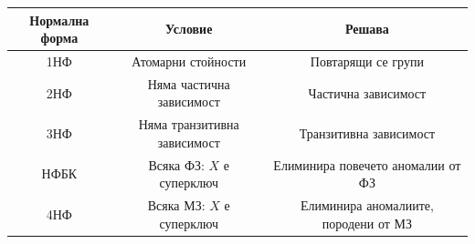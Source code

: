 \documentclass{scrartcl}
\begin{document}
\begin{FlushLeft}
\begin{center}
\begin{tabular}{|c|c|c|}
\hline
\textbf{Нормална форма} & \textbf{Условие} & \textbf{Решава} \\
\hline
1НФ & Атомарни стойности & Повтарящи се групи \\
\hline
2НФ & Няма частична зависимост & Частична зависимост \\
\hline
3НФ & Няма транзитивна зависимост & Транзитивна зависимост \\
\hline
НФБК & Всяка ФЗ: $X$ е суперключ & Елиминира повечето аномалии от ФЗ \\
\hline
4НФ & Всяка МЗ: $X$ е суперключ & Елиминира аномалиите, породени от МЗ \\
\hline
\end{tabular}
\end{center}

\end{FlushLeft}
\end{document}
